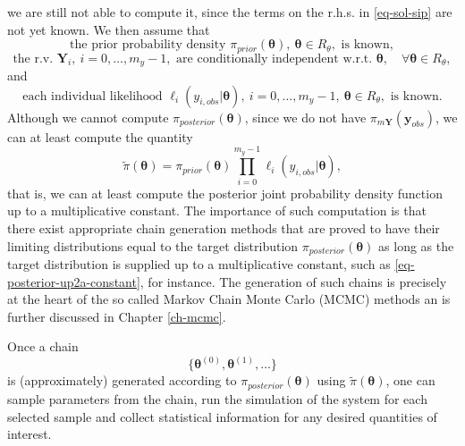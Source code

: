 we are still not able to compute it, since the terms on the r.h.s. in \eqref{eq-sol-sip} are not yet known.
We then assume that
\begin{equation}\label{eq-hyp-prior-known}
\mbox{the prior probability density }\pi_{prior}(\boldsymbol{\theta}),~\boldsymbol\theta\in R_{\theta},\mbox{ is known},
\end{equation}
\begin{equation}\label{eq-hyp-conditional-independence}
\mbox{the r.v. }\mathbf{Y}_i,~i=0,\ldots,m_y-1,\mbox{ are conditionally independent w.r.t. }\boldsymbol\theta,\quad\forall\boldsymbol\theta\in R_{\theta},
\end{equation}
and
\begin{equation}\label{eq-hyp-l-known}
\mbox{each individual likelihood }\ell_i(y_{i,obs}|\boldsymbol\theta),~i=0,\ldots,m_y-1,~\boldsymbol\theta\in R_{\theta},\mbox{ is known}.
\end{equation}
Although we cannot compute $\pi_{posterior}(\boldsymbol\theta)$,
since we do not have $\pi_{m\mathbf{Y}}(\mathbf{y}_{obs})$,
we can at least compute the quantity
\begin{equation}\label{eq-posterior-up2a-constant}
\tilde{\pi}(\boldsymbol\theta) =
{\pi_{prior}(\boldsymbol\theta)\prod_{i=0}^{m_y-1}\ell_i(y_{i,obs}|\boldsymbol\theta)},
\end{equation}
that is, we can at least compute the posterior joint probability density function up to a multiplicative constant.
The importance of such computation is that there exist
appropriate chain generation methods that are proved to have their limiting distributions equal 
to the target distribution $\pi_{posterior}(\boldsymbol\theta)$ as long as the target distribution is supplied
up to a multiplicative constant, such as \eqref{eq-posterior-up2a-constant}, for instance.
The generation of such chains is precisely at the heart of the so called Markov Chain Monte Carlo (MCMC) methods
an is further discussed in Chapter \ref{ch-mcmc}.

Once a chain
\begin{equation}\label{eq-markov-chain}
\{\boldsymbol{\theta}^{(0)},\boldsymbol{\theta}^{(1)},\ldots\}
\end{equation}
is (approximately) generated according to $\pi_{posterior}(\boldsymbol\theta)$ using $\tilde{\pi}(\boldsymbol\theta)$,
one can
sample parameters from the chain,
run the simulation of the system for each selected sample and
collect statistical information for any desired quantities of interest.

